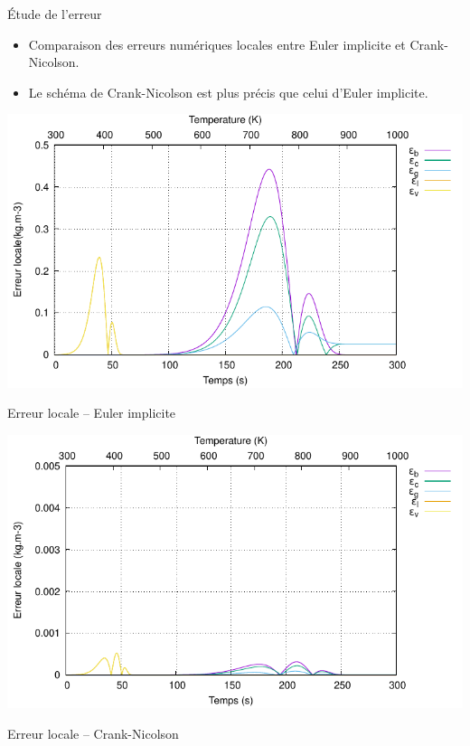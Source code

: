 \documentclass{beamer}
\begin{document}
\begin{frame}{Étude de l'erreur}
    \begin{itemize}
        \item Comparaison des erreurs numériques locales entre Euler implicite et Crank-Nicolson.
        \item Le schéma de Crank-Nicolson est plus précis que celui d'Euler implicite.
    \end{itemize}
    \begin{minipage}{0.48\linewidth}
        \centering
        \includegraphics[width=\linewidth]{images/error_EI.pdf}
        
        \vspace{0.5em}
        {\small Erreur locale – Euler implicite}
    \end{minipage}
    \hfill
    \begin{minipage}{0.48\linewidth}
        \centering
        \includegraphics[width=\linewidth]{images/error_CK2.pdf}
        
        \vspace{0.5em}
        {\small Erreur locale – Crank-Nicolson}
    \end{minipage}
\end{frame}
\end{document}
